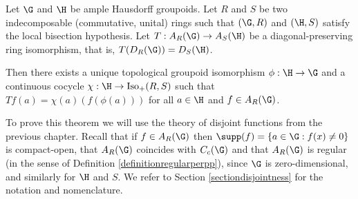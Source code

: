 \begin{theorem}\label{theoremsteinbergalgebras}
Let $\G$ and $\H$ be ample Hausdorff groupoids. Let $R$ and $S$ be two indecomposable (commutative, unital) rings such that $(\G,R)$ and $(\H,S)$ satisfy the local bisection hypothesis. Let $T:A_R(\G)\to A_S(\H)$ be a diagonal-preserving ring isomorphism, that is, $T(D_R(\G))=D_S(\H)$.

Then there exists a unique topological groupoid isomorphism $\phi:\H\to\G$ and a continuous cocycle $\chi:\H\to\operatorname{Iso}_+(R,S)$ such that $Tf(a)=\chi(a)(f(\phi(a)))$ for all $a\in\H$ and $f\in A_R(\G)$.
\end{theorem}

To prove this theorem we will use the theory of disjoint functions from the previous chapter. Recall that if $f\in A_R(\G)$ then $\supp(f)=\left\{a\in\G:f(x)\neq 0\right\}$ is compact-open, that $A_R(\G)$ coincides with $C_c(\G)$ and that $A_R(\G)$ is regular (in the sense of Definition \ref{definitionregularperpp}), since $\G$ is zero-dimensional, and similarly for $\H$ and $S$. We refer to Section \ref{sectiondisjointness} for the notation and nomenclature.

